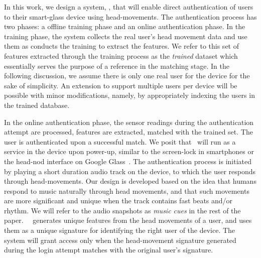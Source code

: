 In this work, we design a system, \systemname, that will enable direct authentication of users to their smart-glass device using
head-movements.  %
The authentication process has two phases: a offline training phase and an 
online authentication phase. In the training phase, the system 
collects the real user's head movement data and use them as 
conducts the training to extract the features. We refer to this set of 
features extracted through the training process as the {\em trained} dataset 
which essentially serves the purpose of a reference in the matching stage. 
In the following discussion, we assume there is only 
one real user for the device for the sake of simplicity. An extension to 
support multiple users per device will be possible with minor modifications, 
namely, by appropriately indexing the users in the trained database.

In the online authentication phase, the sensor readings during the 
authentication attempt are processed, features are extracted, matched with the 
trained set. The user is authenticated upon a successful match.
We posit that \systemname~will run as a service in the device upon power-up, 
similar to the screen-lock in smartphones or the head-nod interface on Google
Glass~\cite{googleglass}.  The authentication process is initiated
by playing a short duration audio track on the device, to which the user 
responds through head-movements. 
Our design is developed based on the idea that humans respond to music 
naturally through head movements, and that such movements are more
significant and unique when the track contains fast beats and/or rhythm.
We will refer to the audio snapshots as {\em music cues} in the rest of the 
paper. 
~\systemname~generates unique features from the head
movements of a user, and uses them as a unique signature for
identifying the right user of the device. The system will
grant access only when the head-movement signature
generated during the login attempt matches with the
original user's signature.

